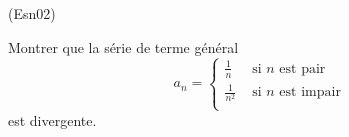 \begin{tiny}(Esn02)\end{tiny} Montrer que la série de terme général 
\begin{displaymath}
  a_n=
  \left\lbrace 
  \begin{aligned}
    \frac{1}{n}&\text{ si } n \text{ est pair} \\
    \frac{1}{n^2}&\text{ si } n \text{ est impair} \\
  \end{aligned}
\right. 
\end{displaymath}
est divergente. 